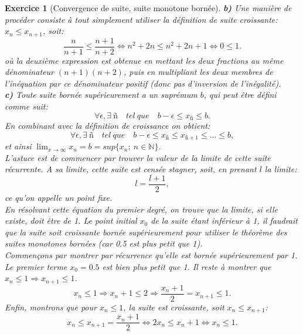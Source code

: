 \documentclass{article}
\newcommand{\Nn}{{\mathbb{N}}}
\theoremstyle{exercice}
\newtheorem{exercice}{Exercice}
\begin{document}
\begin{exercice}[Convergence de suite, suite monotone bornée]
\textbf{b)} Une manière de procéder consiste à tout simplement utiliser la définition de suite croissante: $x_n \leq x_{n+1}$, soit:
\begin{equation}
    \frac{n}{n+1} \leq \frac{n+1}{n+2} \iff n^2 + 2n \leq n^2 + 2n + 1 \iff 0 \leq 1.
\end{equation}
où la deuxième expression est obtenue en mettant les deux fractions au même dénominateur $(n+1)(n+2)$, puis en multipliant les deux membres de l'inéquation par ce dénominateur positif (donc pas d'inversion de l'inégalité).
\\

\textbf{c)} Toute suite bornée supérieurement a un suprémum $b$, qui peut être défini comme suit:
\begin{equation}
    \forall \epsilon, \exists \ ñ \quad tel \ que \quad b-\epsilon \leq x_{ñ} \leq b.
\end{equation}
En combinant avec la définition de croissance on obtient:
\begin{equation}
    \forall \epsilon, \exists \ ñ \quad tel \ que \quad b-\epsilon \leq x_{ñ} \leq x_{ñ+1} \leq ... \leq b,
\end{equation}
et ainsi $ \lim_{x\to\infty} x_n = b = sup\{x_n; \ n \in \Nn\}$.
\\

\faLightbulbO \quad {} L'astuce est de commencer par trouver la valeur de la limite de cette suite récurrente. A sa limite, cette suite est censée stagner, soit, en prenant $l$ la limite:
\begin{equation}
    l = \frac{l + 1}{2},
\end{equation}
ce qu'on appelle un point fixe.\\
En résolvant cette équation du premier degré, on trouve que la limite, si elle existe, doit être de 1. Le point initial $x_0$ de la suite étant inférieur à 1, il faudrait que la suite soit croissante bornée supérieurement pour utiliser le théorème des suites monotones bornées (car 0.5 est plus petit que 1).\\
Commençons par montrer par récurrence qu'elle est bornée supérieurement par 1. Le premier terme $x_0 = 0.5$ est bien plus petit que 1. Il reste à montrer que $x_n \leq 1 \Rightarrow x_{n+1} \leq 1$.
\begin{equation}
    x_n \leq 1 \Rightarrow x_n + 1 \leq 2 \Rightarrow \frac{x_n + 1}{2} = x_{n+1} \leq 1.
\end{equation}
Enfin, montrons que pour $x_n \leq 1$, la suite est croissante, soit $x_n \leq x_{n+1}$:
\begin{equation}
    x_n \leq x_{n+1} = \frac{x_n + 1}{2} \iff 2x_n \leq x_n + 1 \iff x_n \leq 1.
\end{equation}


\end{exercice}
\end{document}
